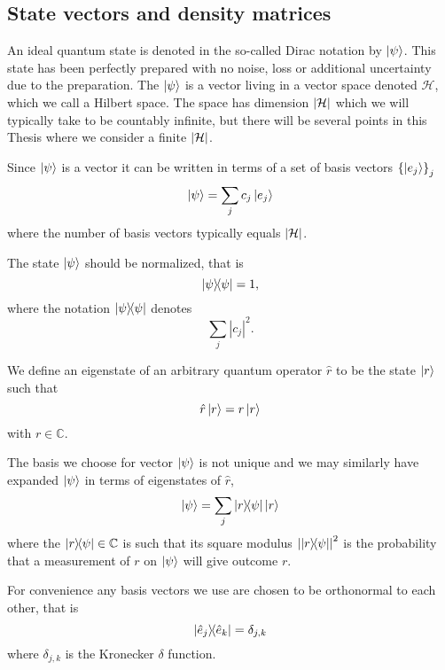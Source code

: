 \FloatBarrier
\subsection{State vectors and density matrices}\label{sec:intro_state_vectors}
An ideal quantum state is denoted in the so-called Dirac notation by $\ket{\psi}$. This state has been perfectly prepared with no noise, loss or additional uncertainty due to the preparation. The $\ket{\psi}$ is a vector living in a vector space denoted $\mathcal{H}$, which we call a Hilbert space. The space has dimension $\left|\mathcal{H}\right|$ which we will typically take to be countably infinite, but there will be several points in this Thesis where we consider a finite $\left|\mathcal{H}\right|$.

Since $\ket{\psi}$ is a vector it can be written in terms of a set of basis vectors $\left\{\ket{e_j}\right\}_j$
\begin{equation}
\ket{\psi} = \sum_j c_j \ket{e_j}
\end{equation}
where the number of basis vectors typically equals $\left|\mathcal{H}\right|$. 

The state $\ket{\psi}$ should be normalized, that is
\begin{equation}
\dyad{\psi} = 1,
\end{equation}
where the notation $\dyad{\psi}$ denotes 
\begin{equation}
\sum_j \left|c_j\right|^2.
\end{equation}

\noindent We define an eigenstate of an arbitrary quantum operator $\hat{r}$ to be the state $\ket{r}$ such that
\begin{equation}
\hat{r} \ket{r} = r \ket{r}
\end{equation}
with $r \in \mathbb{C}$.

The basis we choose for vector $\ket{\psi}$ is not unique and we may similarly have expanded $\ket{\psi}$ in terms of eigenstates of $\hat{r}$,
\begin{equation}
\ket{\psi} = \sum_j \dyad{r}{\psi}\ket{r}
\end{equation}
where the $\dyad{r}{\psi} \in \mathbb{C}$ is such that its square modulus $\left|\dyad{r}{\psi}\right|^2$ is the probability that a measurement of $r$ on $\ket{\psi}$ will give outcome $r$.

For convenience any basis vectors we use are chosen to be orthonormal to each other, that is
\begin{equation}
\dyad{\hat{e}_j}{\hat{e}_k} = \delta_{j, k}
\end{equation}
where $\delta_{j, k}$ is the Kronecker $\delta$ function.

